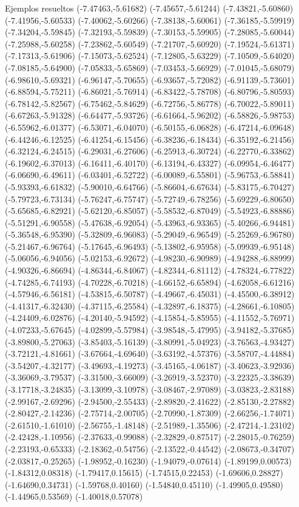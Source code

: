 \documentclass[11pt,a4paper]{article}
\begin{document}
\begin{fmex}{Ejemplos resueltos}
(-7.47463,-5.61682) (-7.45657,-5.61244) (-7.43821,-5.60860) (-7.41956,-5.60533) (-7.40062,-5.60266) (-7.38138,-5.60061) (-7.36185,-5.59919) (-7.34204,-5.59845) (-7.32193,-5.59839) (-7.30153,-5.59905) (-7.28085,-5.60044) (-7.25988,-5.60258) (-7.23862,-5.60549) (-7.21707,-5.60920) (-7.19524,-5.61371) (-7.17313,-5.61906) (-7.15073,-5.62524) (-7.12805,-5.63229) (-7.10509,-5.64020) (-7.08185,-5.64900) (-7.05833,-5.65869) (-7.03453,-5.66929) (-7.01045,-5.68079) (-6.98610,-5.69321) (-6.96147,-5.70655) (-6.93657,-5.72082) (-6.91139,-5.73601) (-6.88594,-5.75211) (-6.86021,-5.76914) (-6.83422,-5.78708) (-6.80796,-5.80593) (-6.78142,-5.82567) (-6.75462,-5.84629) (-6.72756,-5.86778) (-6.70022,-5.89011) (-6.67263,-5.91328) (-6.64477,-5.93726) (-6.61664,-5.96202) (-6.58826,-5.98753) (-6.55962,-6.01377) (-6.53071,-6.04070) (-6.50155,-6.06828) (-6.47214,-6.09648) (-6.44246,-6.12525) (-6.41254,-6.15456) (-6.38236,-6.18434) (-6.35192,-6.21456) (-6.32124,-6.24515) (-6.29031,-6.27606) (-6.25913,-6.30724) (-6.22770,-6.33862) (-6.19602,-6.37013) (-6.16411,-6.40170) (-6.13194,-6.43327) (-6.09954,-6.46477) (-6.06690,-6.49611) (-6.03401,-6.52722) (-6.00089,-6.55801) (-5.96753,-6.58841) (-5.93393,-6.61832) (-5.90010,-6.64766) (-5.86604,-6.67634) (-5.83175,-6.70427) (-5.79723,-6.73134) (-5.76247,-6.75747) (-5.72749,-6.78256) (-5.69229,-6.80650) (-5.65685,-6.82921) (-5.62120,-6.85057) (-5.58532,-6.87049) (-5.54923,-6.88886) (-5.51291,-6.90558) (-5.47638,-6.92054) (-5.43963,-6.93365) (-5.40266,-6.94481) (-5.36548,-6.95390) (-5.32809,-6.96083) (-5.29049,-6.96549) (-5.25269,-6.96780) (-5.21467,-6.96764) (-5.17645,-6.96493) (-5.13802,-6.95958) (-5.09939,-6.95148) (-5.06056,-6.94056) (-5.02153,-6.92672) (-4.98230,-6.90989) (-4.94288,-6.88999) (-4.90326,-6.86694) (-4.86344,-6.84067) (-4.82344,-6.81112) (-4.78324,-6.77822) (-4.74285,-6.74193) (-4.70228,-6.70218) (-4.66152,-6.65894) (-4.62058,-6.61216) (-4.57946,-6.56181) (-4.53815,-6.50787) (-4.49667,-6.45031) (-4.45500,-6.38912) (-4.41317,-6.32430) (-4.37115,-6.25584) (-4.32897,-6.18375) (-4.28661,-6.10805) (-4.24409,-6.02876) (-4.20140,-5.94592) (-4.15854,-5.85955) (-4.11552,-5.76971) (-4.07233,-5.67645) (-4.02899,-5.57984) (-3.98548,-5.47995) (-3.94182,-5.37685) (-3.89800,-5.27063) (-3.85403,-5.16139) (-3.80991,-5.04923) (-3.76563,-4.93427) (-3.72121,-4.81661) (-3.67664,-4.69640) (-3.63192,-4.57376) (-3.58707,-4.44884) (-3.54207,-4.32177) (-3.49693,-4.19273) (-3.45165,-4.06187) (-3.40623,-3.92936) (-3.36069,-3.79537) (-3.31500,-3.66009) (-3.26919,-3.52370) (-3.22325,-3.38639) (-3.17718,-3.24835) (-3.13099,-3.10978) (-3.08467,-2.97089) (-3.03823,-2.83188) (-2.99167,-2.69296) (-2.94500,-2.55433) (-2.89820,-2.41622) (-2.85130,-2.27882) (-2.80427,-2.14236) (-2.75714,-2.00705) (-2.70990,-1.87309) (-2.66256,-1.74071) (-2.61510,-1.61010) (-2.56755,-1.48148) (-2.51989,-1.35506) (-2.47214,-1.23102) (-2.42428,-1.10956) (-2.37633,-0.99088) (-2.32829,-0.87517) (-2.28015,-0.76259) (-2.23193,-0.65333) (-2.18362,-0.54756) (-2.13522,-0.44542) (-2.08673,-0.34707) (-2.03817,-0.25265) (-1.98952,-0.16230) (-1.94079,-0.07614) (-1.89199,0.00573) (-1.84312,0.08318) (-1.79417,0.15615) (-1.74515,0.22453) (-1.69606,0.28827) (-1.64690,0.34731) (-1.59768,0.40160) (-1.54840,0.45110) (-1.49905,0.49580) (-1.44965,0.53569) (-1.40018,0.57078) 
\end{fmex}
\end{document}
